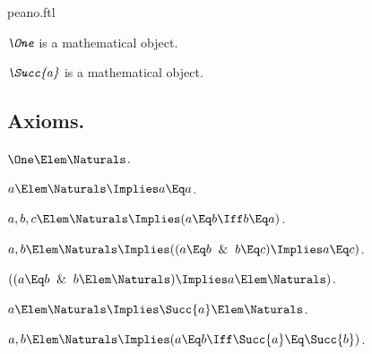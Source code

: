 \documentclass{stex}
\begin{document}
\begin{smodule}{peano.ftl}
\begin{forthel}
  \begin{signature*}[for=One]
    $\emph{\One}$ is a mathematical object.
  \end{signature*}

  \begin{signature*}[for=Succ]
    $\emph{\Succ{a}}$ is a mathematical object.
  \end{signature*}
\end{forthel}


\subsection{Axioms.}


\begin{forthel}
  \begin{axiom*}[title=1,name=P1]
    $\One \Elem \Naturals$.
  \end{axiom*}

  \begin{axiom*}[title=2,name=P2]
    $a \Elem \Naturals \Implies a \Eq a$.
  \end{axiom*}
  
  \begin{axiom*}[title=3,name=P3]
    $a,b,c \Elem \Naturals \Implies (a \Eq b \Iff b \Eq a)$.
  \end{axiom*}
  
  \begin{axiom*}[title=4,name=P4]
    $a,b \Elem \Naturals \Implies ((a \Eq b \And b \Eq c) \Implies a \Eq c)$.
  \end{axiom*}
  
  \begin{axiom*}[title=5,name=P5]
    $((a \Eq b \And b \Elem \Naturals) \Implies a \Elem \Naturals)$.
  \end{axiom*}
  
  \begin{axiom*}[title=6,name=P6]
    $a \Elem \Naturals \Implies \Succ{a} \Elem \Naturals$.
  \end{axiom*}
  
  \begin{axiom*}[title=7,name=P7]
    $a,b \Elem \Naturals \Implies (a \Eq b \Iff \Succ{a} \Eq \Succ{b})$.
  \end{axiom*}
  

\end{forthel}
\end{smodule}
\end{document}
